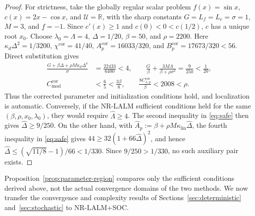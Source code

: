 \documentclass[11pt]{article}
\theoremstyle{definition}
\theoremstyle{remark}
\numberwithin{equation}{section}
\numberwithin{figure}{section}
\numberwithin{table}{section}
\numberwithin{algorithm}{section}
\begin{document}
\begin{proof}
For strictness, take the globally regular scalar problem
\(f(x)=\sin x\), \(c(x)=2x-\cos x\), and \(\mathcal U=\mathbb R\), with
the sharp constants \(G=L_f=L_c=\sigma=1\), \(M=3\), and
\(\underline f=-1\).  Since \(c'(x)\ge1\) and
\(c(0)<0<c(1/2)\), \(c\) has a unique root \(x_0\).  Choose
\(\lambda_0=\Lambda=4\), \(\Delta=1/20\), \(\beta=50\), and \(\rho=2200\).
Here \(\kappa_d\Delta^2=1/3200\),
\(\chi^{\mathrm{cor}}=41/40\),
\(A_p^{\mathrm{cor}}=16033/320\), and
\(B_p^{\mathrm{cor}}=17673/320<56\).  Direct substitution gives
\begin{align*}
 \frac{G+\beta\Delta+\rho M\kappa_d\Delta^4}{\sigma}
 &=\frac{22433}{6400}<4,\qquad
 \frac{G}{\beta}+\frac{3M\Lambda}{\beta+\rho\sigma^2}
 =\frac9{250}<\frac1{20},\\
 C_{\mathrm{mod}}^{\mathrm{cor}}&<\frac65<\frac{3\beta}{8},\qquad
 \frac{8C_{\lambda,p}^{\mathrm{cor}}}{\beta}<2008<\rho.
\end{align*}
Thus the corrected parameter and initialization conditions hold, and
localization is automatic.  Conversely, if the NR-LALM sufficient conditions
held for the same \((\beta,\rho,x_0,\lambda_0)\), they would require
\(\widehat\Lambda\ge4\).  The second inequality in \eqref{eq:safe} then gives
\(\widehat\Delta\ge9/250\).  On the other hand, with
\(\widehat A_p:=\beta+\rho M\kappa_{\mathrm{lin}}\widehat\Delta\), the fourth
inequality in \eqref{eq:safe} gives
\(44\ge32(1+66\widehat\Delta)^2\), and hence
\(\widehat\Delta\le
(\sqrt{11/8}-1)/66<1/330\).
Since \(9/250>1/330\), no such auxiliary pair exists.
\end{proof}

Proposition~\ref{prop:parameter-region} compares only the sufficient
conditions derived above, not the actual convergence domains of the two methods.  We now transfer the convergence and complexity results of Sections~\ref{sec:deterministic} and~\ref{sec:stochastic} to NR-LALM+SOC.
\end{document}
